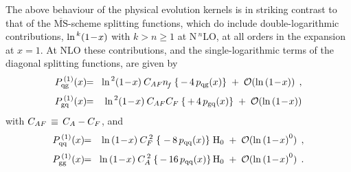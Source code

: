 \documentclass[12pt]{article}
\newcommand{\bea}{\begin{eqnarray}}
\newcommand{\eea}{\end{eqnarray}}
\newcommand{\MSb}{$\overline{\mbox{MS}}$}
\begin{document}
The above behaviour of the physical evolution kernels is in striking contrast 
to that of the \MSb-scheme splitting functions, which do include 
double-logarithmic contributions, $\ln^{\,k}\! \x1$ with $k > n \geq 1$ at 
N$^{\:\!n}$LO, at all orders in the expansion at $x=1$.
At NLO these contributions, and the single-logarithmic terms of the
diagonal splitting functions, are given by
%
\bea
\label{Pqg1DL}
  P_{\rm qg}^{\,(1)}(x) &\!\! = \!&
%
    \ln^{\,2}\! \x1 \: \* \caf \* \nf \: \* \{\, -\,4\,\* \pqg(x) \} 
    \; + \; {\cal O}(\ln \x1)
  \:\: ,
\\[1mm]
\label{Pgq1DL}
 P_{\rm gq}^{\,(1)}(x) &\!\! = \!& 
%
    \ln^{\,2}\! \x1 \: \* \caf \* \cf \: \* \{\, +\,4\,\* \pgq(x) \} 
    \; + \; {\cal O}(\ln \x1)
\eea
%
with ${C_{AF}} \,\equiv\, {C_A} - {C_F}$, and
%
\bea
\label{Pqq1SL}
P_{\rm qq}^{\,(1)}(x) &\!\! = \!&
%
  \ln \x1 \: \* \cfs \; \* \{\; -\,8\,\* \pqq(x) \}\; \* \H(0)
    \; + \; {\cal O}(\ln \x1^{0})
 \:\: ,
\\[1mm]
%
\label{Pgg1SL}
 P_{\rm gg}^{\,(1)}(x) &\!\! = \!&
%
  \ln \x1 \: \* \cas \: \* \{\, -\,16\,\* \pqq(x) \}\, \* \H(0)
    \; + \; {\cal O}(\ln \x1^{0}) 
 \:\: .
\eea
\end{document}
